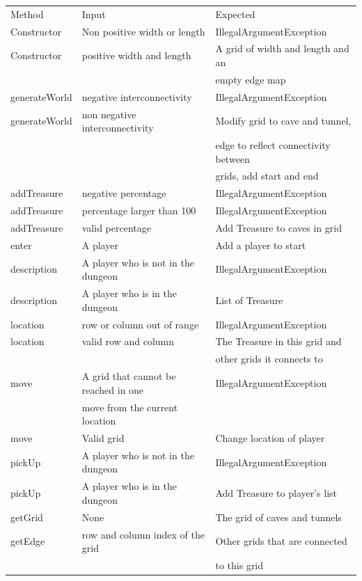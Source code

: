 \documentclass[12pt]{amsart}
\begin{document}
\begin{table}[htbp]
   \begin{tabular}{@{} lll @{}} %

      Method     & Input & Expected \\
         Constructor   & Non positive width or length     &  IllegalArgumentException \\
         Constructor   & positive width and length     &  A grid of width and length and an\\ & & empty edge map\\
         generateWorld & negative interconnectivity & IllegalArgumentException\\
         generateWorld & non negative interconnectivity & Modify grid to cave and tunnel,\\& & edge to reflect connectivity between  \\ & &grids, add start and end\\
         addTreasure & negative percentage & IllegalArgumentException\\
         addTreasure &  percentage larger than 100 & IllegalArgumentException\\
         addTreasure &  valid percentage & Add Treasure to caves in grid\\
         enter & A player & Add a player to start\\
         description & A player who is not in the dungeon & IllegalArgumentException\\
         description & A player who is in the dungeon & List of Treasure\\
         location & row or column out of range & IllegalArgumentException\\
        location & valid row and column & The Treasure in this grid and \\
         && other grids it connects to\\
         move & A grid that cannot be reached in one & IllegalArgumentException\\
          & move from the current location & \\
         move & Valid grid & Change location of player\\
         pickUp & A player who is not in the dungeon & IllegalArgumentException\\
         pickUp & A player who is in the dungeon & Add Treasure to player's list\\
         getGrid & None & The grid of caves and tunnels\\
         getEdge & row and column index of the grid & Other grids that are connected \\&&to this grid\\
         
    \end{tabular}
\end{table}
\end{document}
